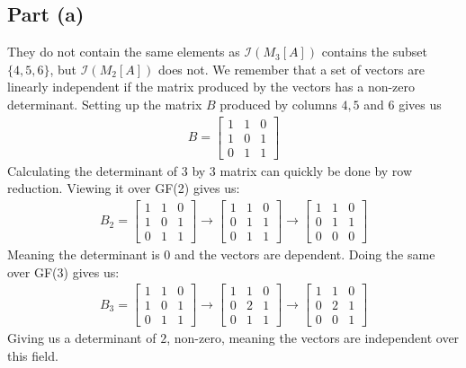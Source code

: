 \documentclass[a4paper, fleqn]{article}
\begin{document}
\subsection*{Part (a)}
They do not contain the same elements as $\mathcal{I}(M_3[A])$ contains the subset $\{4,5,6\}$, but $\mathcal{I}(M_2[A])$ does not. We remember that a set of vectors are linearly independent if the matrix produced by the vectors has a non-zero determinant. Setting up the matrix $B$ produced by columns $4,5$ and $6$ gives us
\begin{align*}
  B = \begin{bmatrix}
  1 & 1 & 0 \\
  1 & 0 & 1 \\
  0 & 1 & 1
  \end{bmatrix}
\end{align*}
Calculating the determinant of $3$ by $3$ matrix can quickly be done by row reduction. Viewing it over GF(2) gives us:
\begin{align*}
    B_2 = \begin{bmatrix}
    1 & 1 & 0 \\
    1 & 0 & 1 \\
    0 & 1 & 1
    \end{bmatrix}
    \rightarrow
    \begin{bmatrix}
    1 & 1 & 0 \\
    0 & 1 & 1 \\
    0 & 1 & 1
    \end{bmatrix}
    \rightarrow
    \begin{bmatrix}
    1 & 1 & 0 \\
    0 & 1 & 1 \\
    0 & 0 & 0
    \end{bmatrix}
\end{align*}
Meaning the determinant is $0$ and the vectors are dependent. Doing the same over GF(3) gives us:
\begin{align*}
    B_3 = \begin{bmatrix}
    1 & 1 & 0 \\
    1 & 0 & 1 \\
    0 & 1 & 1
    \end{bmatrix}
    \rightarrow
    \begin{bmatrix}
    1 & 1 & 0 \\
    0 & 2 & 1 \\
    0 & 1 & 1
    \end{bmatrix}
    \rightarrow
    \begin{bmatrix}
    1 & 1 & 0 \\
    0 & 2 & 1 \\
    0 & 0 & 1
    \end{bmatrix}
\end{align*}
Giving us a determinant of $2$, non-zero, meaning the vectors are independent over this field.
\end{document}
